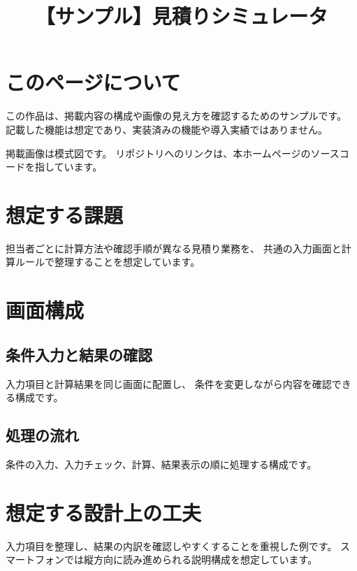 \title{【サンプル】見積りシミュレータ}


\begin{portfolio}

\section{このページについて}

この作品は、掲載内容の構成や画像の見え方を確認するためのサンプルです。
記載した機能は想定であり、実装済みの機能や導入実績ではありません。

掲載画像は模式図です。
リポジトリへのリンクは、本ホームページのソースコードを指しています。

\section{想定する課題}

担当者ごとに計算方法や確認手順が異なる見積り業務を、
共通の入力画面と計算ルールで整理することを想定しています。

\section{画面構成}

\subsection{条件入力と結果の確認}

入力項目と計算結果を同じ画面に配置し、
条件を変更しながら内容を確認できる構成です。


\subsection{処理の流れ}

条件の入力、入力チェック、計算、結果表示の順に処理する構成です。


\section{想定する設計上の工夫}

入力項目を整理し、結果の内訳を確認しやすくすることを重視した例です。
スマートフォンでは縦方向に読み進められる説明構成を想定しています。

\end{portfolio}
